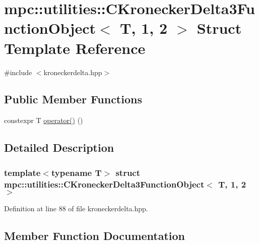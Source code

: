 \hypertarget{structmpc_1_1utilities_1_1_c_kronecker_delta3_function_object_3_01_t_00_011_00_012_01_4}{}\section{mpc\+:\+:utilities\+:\+:C\+Kronecker\+Delta3\+Function\+Object$<$ T, 1, 2 $>$ Struct Template Reference}
\label{structmpc_1_1utilities_1_1_c_kronecker_delta3_function_object_3_01_t_00_011_00_012_01_4}


{\ttfamily \#include $<$kroneckerdelta.\+hpp$>$}

\subsection*{Public Member Functions}
\begin{DoxyCompactItemize}
\item 
constexpr T \mbox{\hyperlink{structmpc_1_1utilities_1_1_c_kronecker_delta3_function_object_3_01_t_00_011_00_012_01_4_adb3e5df347bcdfda72b191b33a4e9a52}{operator()}} ()
\end{DoxyCompactItemize}


\subsection{Detailed Description}
\subsubsection*{template$<$typename T$>$\newline
struct mpc\+::utilities\+::\+C\+Kronecker\+Delta3\+Function\+Object$<$ T, 1, 2 $>$}



Definition at line 88 of file kroneckerdelta.\+hpp.



\subsection{Member Function Documentation}
\mbox{\label{structmpc_1_1utilities_1_1_c_kronecker_delta3_function_object_3_01_t_00_011_00_012_01_4_adb3e5df347bcdfda72b191b33a4e9a52}} 
